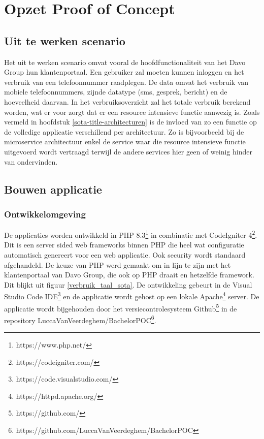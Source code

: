 \chapter{Opzet Proof of Concept}
\label{ch:opzet-poc}
\section{Uit te werken scenario}\label{poc-scenario}
Het uit te werken scenario omvat vooral de hoofdfunctionaliteit van het Davo Group hun klantenportaal. Een gebruiker zal moeten kunnen inloggen en het verbruik van een telefoonnummer raadplegen. De data omvat het verbruik van mobiele telefoonnummers, zijnde datatype (sms, gesprek, bericht) en de hoeveelheid daarvan. In het verbruiksoverzicht zal het totale verbruik berekend worden, wat er voor zorgt dat er een resource intensieve functie aanwezig is. Zoals vermeld in hoofdstuk \ref{sota-title-architecturen} is de invloed van zo een functie op de volledige applicatie verschillend per architectuur. Zo is bijvoorbeeld bij de microservice architectuur enkel de service waar die resource intensieve functie uitgevoerd wordt vertraagd terwijl de andere services hier geen of weinig hinder van ondervinden. 

\section{Bouwen applicatie}
\subsection{Ontwikkelomgeving}\label{poc-ontwikkelomgeving}
De applicaties worden ontwikkeld in PHP 8.3\footnote{https://www.php.net/} in combinatie met CodeIgniter 4\footnote{https://codeigniter.com/}. Dit is een server sided web frameworks binnen PHP die heel wat configuratie automatisch genereert voor een web applicatie. Ook security wordt standaard afgehandeld. De keuze van PHP werd gemaakt om in lijn te zijn met het klantenportaal van Davo Group, die ook op PHP draait en hetzelfde framework. Dit blijkt uit figuur \ref{verbruik_taal_sota}. De ontwikkeling gebeurt in de Visual Studio Code IDE\footnote{https://code.visualstudio.com/} en de applicatie wordt gehost op een lokale Apache\footnote{https://httpd.apache.org/} server. De applicatie wordt bijgehouden door het versiecontrolesysteem Github\footnote{https://github.com/} in de repository LuccaVanVeerdeghem/BachelorPOC\footnote{https://github.com/LuccaVanVeerdeghem/BachelorPOC}.



